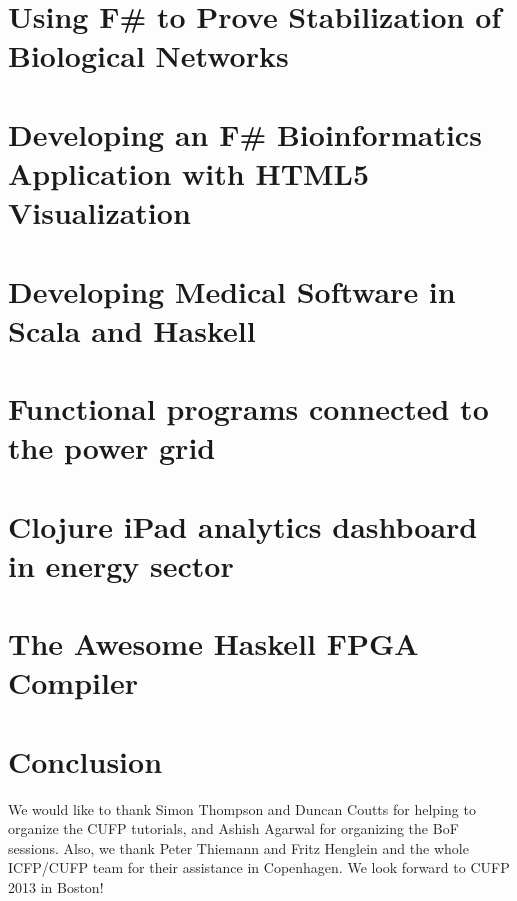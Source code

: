 \documentclass{jfp1}
\begin{document}
\section{Using F\# to Prove Stabilization of Biological Networks}

\section{Developing an F\# Bioinformatics Application with HTML5
  Visualization}

\section{Developing Medical Software in Scala and Haskell}

\section{Functional programs connected to the power grid}

\section{Clojure iPad analytics dashboard in energy sector}

\section{The Awesome Haskell FPGA Compiler}

\section{Conclusion}

We would like to thank Simon Thompson and Duncan Coutts for helping to
organize the CUFP tutorials, and Ashish Agarwal for organizing the BoF
sessions.  Also, we thank Peter Thiemann and Fritz Henglein and the
whole ICFP/CUFP team for their assistance in Copenhagen.  We look
forward to CUFP 2013 in Boston!


\end{document}
